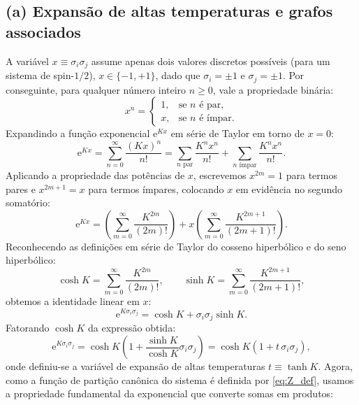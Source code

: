 \documentclass[11pt,a4paper]{article}
\newcommand{\e}[1]{\mathrm{e}^{#1}}
\begin{document}
\subsection*{(a) Expansão de altas temperaturas e grafos associados}
A variável $x \equiv \sigma_i \sigma_j$ assume apenas dois valores discretos possíveis (para um sistema de spin-$1/2$), $x \in \{-1, +1\}$, dado que $\sigma_i = \pm 1$ e $\sigma_j = \pm 1$. Por conseguinte, para qualquer número inteiro $n \ge 0$, vale a propriedade binária:
%
\begin{equation}
    x^n = 
    \begin{cases} 
    1, & \text{se } n \text{ é par}, \\
    x, & \text{se } n \text{ é ímpar}.
    \end{cases}
\end{equation}
%
Expandindo a função exponencial $\e{K x}$ em série de Taylor em torno de $x=0$:
%
\begin{equation}
    \e{K x} = \sum_{n=0}^{\infty} \frac{(K x)^n}{n!} = \sum_{n \text{ par}} \frac{K^n x^n}{n!} + \sum_{n \text{ ímpar}} \frac{K^n x^n}{n!}.
\end{equation}
%
Aplicando a propriedade das potências de $x$, escrevemos $x^{2m} = 1$ para termos pares e $x^{2m+1} = x$ para termos ímpares, colocando $x$ em evidência no segundo somatório:
%
\begin{equation}
    \e{K x} = \left( \sum_{m=0}^{\infty} \frac{K^{2m}}{(2m)!} \right) + x \left( \sum_{m=0}^{\infty} \frac{K^{2m+1}}{(2m+1)!} \right).
\end{equation}
%
Reconhecendo as definições em série de Taylor do cosseno hiperbólico e do seno hiperbólico:
%
\begin{equation}
    \cosh K = \sum_{m=0}^{\infty} \frac{K^{2m}}{(2m)!}, \qquad \sinh K = \sum_{m=0}^{\infty} \frac{K^{2m+1}}{(2m+1)!},
\end{equation}
%
obtemos a identidade linear em $x$:
%
\begin{equation}
    \e{K \sigma_i \sigma_j} = \cosh K + \sigma_i \sigma_j \sinh K.
\end{equation}
%
Fatorando $\cosh K$ da expressão obtida:
%
\begin{equation}
    \e{K \sigma_i \sigma_j} = \cosh K \left( 1 + \frac{\sinh K}{\cosh K} \sigma_i \sigma_j \right) = \cosh K \left(1 + t\, \sigma_i \sigma_j\right),
    \label{eq:identity}
\end{equation}
%
onde definiu-se a variável de expansão de altas temperaturas $t \equiv \tanh K$. Agora, como a função de partição canônica do sistema é definida por \eqref{eq:Z_def}, usamos a propriedade fundamental da exponencial que converte somas em produtos:
\end{document}
